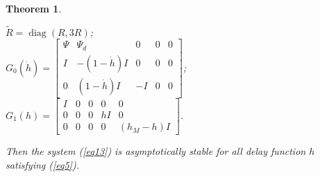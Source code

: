 \documentclass[journal]{IEEEtran}
\newtheorem{theorem}{Theorem}
\begin{document}
\begin{theorem}
\begin{itemize}
      $ \tilde R = \operatorname{diag} (R,3R) $;\\
      $ {G_0}(\dot h) = \left[ {\begin{array}{*{20}{c}}
                \Psi & {{\Psi _d}}        & 0      & 0 & 0 \\
                I    & { - (1 - \dot h)I} & 0      & 0 & 0 \\
                0    & {(1 - \dot h)I}    & { - I} & 0 & 0
              \end{array}} \right] $;\\
      $ {G_1}(h) = \left[ {\begin{array}{*{20}{c}}
                I & 0 & 0 & 0    & 0                             \\
                0 & 0 & 0 & {hI} & 0                             \\
                0 & 0 & 0 & 0    & {\left( {{h_M} - h} \right)I}
              \end{array}} \right] $.\\
  \end{itemize}
  Then the system (\ref{eq13}) is asymptotically stable for all delay function $h$ satisfying (\ref{eq5}).

\end{theorem}
\end{document}
